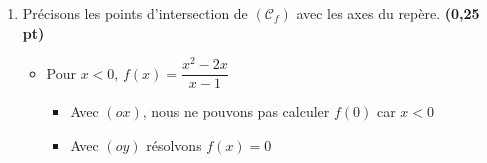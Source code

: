 \documentclass[12pt,a4paper]{article}
\begin{document}
\begin{enumerate}
\begin{itemize}

  
$$ \textbf{Or } 2\sqrt{x^2+x}+2x+1 > 0 \, \forall x\in ]0;+\infty[ $$

\textcolor{red}{Ainsi  $\forall x\in ]0;+\infty[$ $f'(x) > 0 $ donc f  est croissant $0;+\infty[$}
\end{itemize}
    
    
  
++++++++++++++++++++++++




+++++++++++++++++++++++++

    \item Précisons les points d'intersection de $(\mathcal{C}_f)$ avec les axes du repère. \textbf{(0,25 pt)}

\begin{itemize}
\item Pour $ x<0 $, $ f(x)= \dfrac{x^2-2x}{x-1} $

\begin{itemize}
\item Avec $(ox)$, nous ne pouvons pas calculer $f(0)$ car $ x<0 $

\item Avec $(oy)$ résolvons $f(x)=0$


\end{itemize}
\end{itemize}
\end{enumerate}
\end{document}
